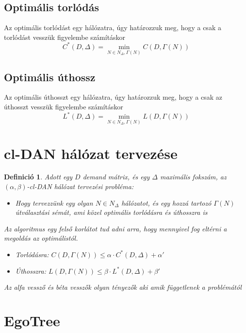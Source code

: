\documentclass[12pt]{report}
\newtheorem{mydef}{Definició}
\begin{document}
\subsection{Optimális torlódás}

Az optimális torlódást egy  hálózatra, úgy határozzuk meg, hogy a csak a torlódást vesszük figyelembe számításkor \[C^*(D, \Delta) = \min_{N \in N_\Delta, \Gamma(N)} C(D, \Gamma(N))\]

\subsection{Optimális úthossz}

Az optimális úthosszt egy  hálózatra, úgy határozzuk meg, hogy a csak az úthosszt vesszük figyelembe számításkor \[L^*(D, \Delta) = \min_{N \in N_\Delta, \Gamma(N)} L(D, \Gamma(N))\]

\section{cl-DAN hálózat tervezése}
	
\begin{mydef}
	Adott egy \(D\) demand mátrix, és egy \(\Delta\) maximális fokszám, az \((\alpha, \beta)\)-cl-DAN hálózat tervezési probléma:
	\begin{itemize}
		\item Hogy tervezzünk egy olyan \(N \in N_\Delta\) hálózatot, és egy hozzá tartozó \(\Gamma(N)\) útválasztási sémát, ami közel optimális torlódásra és úthosszra is
	\end{itemize}

	Az algoritmus egy felső korlátot tud adni arra, hogy mennyivel fog eltérni a megoldás az optimálistól.
	\begin{itemize}
		\item Torlódásra: \(C(D, \Gamma(N)) \le \alpha \cdot C^*(D, \Delta) + \alpha'\)
		\item Úthosszra: \(L(D, \Gamma(N)) \le \beta \cdot L^*(D, \Delta) + \beta'\)
	\end{itemize}
	Az alfa vessző és béta vesszők olyan tényezők aki amik függetlenek a problémától
\end{mydef}

\section{EgoTree}
\end{document}
